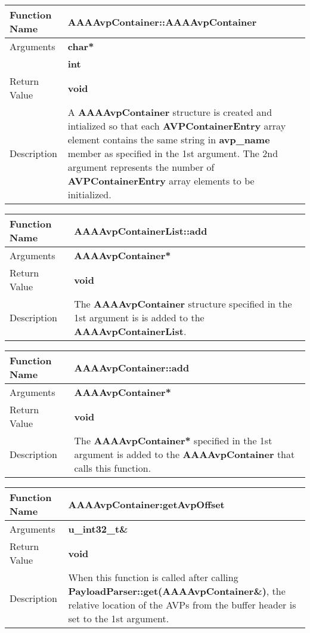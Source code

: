 \begin{flushleft}
\begin{tabular}[t]{|l|p{3in}|}\hline
 Function Name & {\bf AAAAvpContainer::AAAAvpContainer}
\\\hline
 Arguments & {\bf char*} \\\cline{2-2}
           & {\bf int} \\\hline
 Return Value & {\bf void}
\\\hline
 Description & 

 A {\bf AAAAvpContainer} structure is created and intialized so that
 each {\bf AVPContainerEntry} array element contains the same string in
 {\bf avp\_name} member as specified in the 1st argument.  The 2nd
 argument represents the number of {\bf AVPContainerEntry} array
 elements  to be initialized.  \\\hline
\end{tabular}
\end{flushleft}

\begin{flushleft}
\begin{tabular}[t]{|l|p{3in}|}\hline
 Function Name & {\bf AAAAvpContainerList::add}
\\\hline
 Arguments & {\bf AAAAvpContainer*}
\\\hline
 Return Value & {\bf void}
\\\hline
 Description &  
 The {\bf AAAAvpContainer} structure specified in the 1st argument is
 is added to the {\bf AAAAvpContainerList}.
 \\\hline
\end{tabular}
\end{flushleft}

\begin{flushleft}
\begin{tabular}[t]{|l|p{3in}|}\hline
 Function Name & {\bf AAAAvpContainer::add}
\\\hline
 Arguments & {\bf AAAAvpContainer*}
\\\hline
 Return Value & {\bf void}
\\\hline
 Description &  
 The {\bf AAAAvpContainer*} specified in the 1st argument is 
 added to the {\bf AAAAvpContainer} that calls this function.
 \\\hline
\end{tabular}
\end{flushleft}

\begin{flushleft}
\begin{tabular}[t]{|l|p{3in}|}\hline
 Function Name & {\bf AAAAvpContainer:getAvpOffset}
\\\hline
 Arguments & {\bf u\_int32\_t\&}
\\\hline
 Return Value & {\bf void}
\\\hline
 Description &  
 When this function is called after calling {\bf
 PayloadParser::get(AAAAvpContainer\&)}, 
 the relative location of the AVPs from the buffer header 
 is set to the 1st argument.
 \\\hline
\end{tabular}
\end{flushleft}

